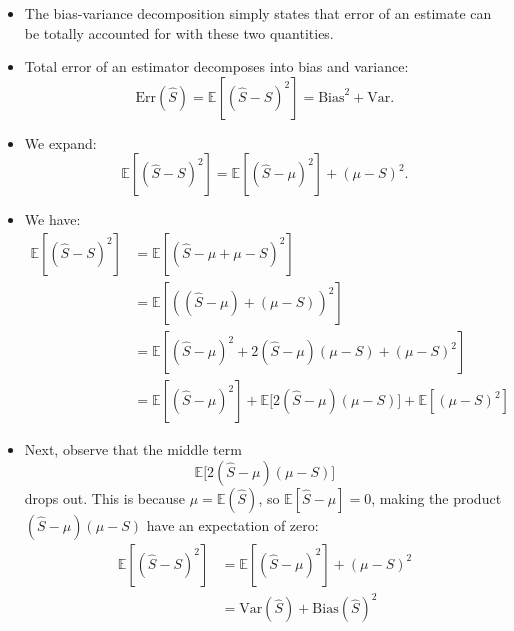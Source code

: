 \begin{itemize}
    \item The bias-variance decomposition simply states that error of an estimate can be totally accounted for with these two quantities.
    \item Total error of an estimator decomposes into bias and variance:
          \[
              \mathrm{Err}(\hat{S}) = \mathbb{E}[(\hat{S} - S)^2] = \mathrm{Bias}^2 + \mathrm{Var}.
          \]
    \item We expand:
          \[
              \mathbb{E}[(\hat{S} - S)^2] = \mathbb{E}[(\hat{S} - \mu)^2] + (\mu - S)^2.
          \]
    \item We have:
          \begin{align}
              \mathbb{E}[(\hat{S}-S)^{2}] & =\mathbb{E}\left[\left(\hat{S}-\mu+\mu-S\right)^{2}\right]                  \label{eq:bias_variance_decomposition_problem} \\
                                          & =\mathbb{E}\left[\left((\hat{S}-\mu)+(\mu-S)\right)^{2}\right]                                                             \\
                                          & =\mathbb{E}\left[(\hat{S}-\mu)^{2}+2(\hat{S}-\mu)(\mu-S)+(\mu-S)^{2}\right]                                                \\
                                          & =\mathbb{E}[(\hat{S}-\mu)^{2}]+\mathbb{E}\Big[2(\hat{S}-\mu)(\mu-S)\Big]+\mathbb{E}[(\mu-S)^{2}]
          \end{align}
    \item Next, observe that the middle term
          \[
              \mathbb{E}\Big[2(\hat{S}-\mu)(\mu-S)\Big]
          \]
          drops out. This is because \(\mu = \mathbb{E}(\hat{S})\), so \(\mathbb{E}[\hat{S}-\mu] = 0\), making the product \((\hat{S}-\mu)(\mu-S)\) have an expectation of zero:
          \begin{align*}
              \mathbb{E}[(\hat{S} - S)^2] & = \mathbb{E}[(\hat{S} - \mu)^2] + (\mu - S)^2   \\
                                          & =\mathrm{Var}(\hat{S})+\mathrm{Bias}(\hat{S})^2
          \end{align*}

\end{itemize}

